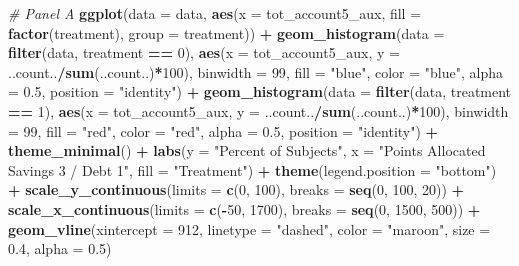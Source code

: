 \documentclass[
]{article}
\newenvironment{Shaded}{\begin{snugshade}}{\end{snugshade}}
\newcommand{\AttributeTok}[1]{\textcolor[rgb]{0.13,0.29,0.53}{#1}}
\newcommand{\CommentTok}[1]{\textcolor[rgb]{0.56,0.35,0.01}{\textit{#1}}}
\newcommand{\DecValTok}[1]{\textcolor[rgb]{0.00,0.00,0.81}{#1}}
\newcommand{\FloatTok}[1]{\textcolor[rgb]{0.00,0.00,0.81}{#1}}
\newcommand{\FunctionTok}[1]{\textcolor[rgb]{0.13,0.29,0.53}{\textbf{#1}}}
\newcommand{\NormalTok}[1]{#1}
\newcommand{\SpecialCharTok}[1]{\textcolor[rgb]{0.81,0.36,0.00}{\textbf{#1}}}
\newcommand{\StringTok}[1]{\textcolor[rgb]{0.31,0.60,0.02}{#1}}
\begin{document}
\begin{Shaded}
\begin{Highlighting}[]
\CommentTok{\# Panel A}
\FunctionTok{ggplot}\NormalTok{(}\AttributeTok{data =}\NormalTok{ data, }\FunctionTok{aes}\NormalTok{(}\AttributeTok{x =}\NormalTok{ tot\_account5\_aux, }\AttributeTok{fill =} \FunctionTok{factor}\NormalTok{(treatment), }\AttributeTok{group =}\NormalTok{ treatment)) }\SpecialCharTok{+}
  \FunctionTok{geom\_histogram}\NormalTok{(}\AttributeTok{data =} \FunctionTok{filter}\NormalTok{(data, treatment }\SpecialCharTok{==} \DecValTok{0}\NormalTok{),}
                 \FunctionTok{aes}\NormalTok{(}\AttributeTok{x =}\NormalTok{ tot\_account5\_aux, }\AttributeTok{y =}\NormalTok{ ..count..}\SpecialCharTok{/}\FunctionTok{sum}\NormalTok{(..count..)}\SpecialCharTok{*}\DecValTok{100}\NormalTok{),}
                 \AttributeTok{binwidth =} \DecValTok{99}\NormalTok{, }\AttributeTok{fill =} \StringTok{"blue"}\NormalTok{, }\AttributeTok{color =} \StringTok{"blue"}\NormalTok{, }\AttributeTok{alpha =} \FloatTok{0.5}\NormalTok{, }\AttributeTok{position =} \StringTok{"identity"}\NormalTok{) }\SpecialCharTok{+}
  \FunctionTok{geom\_histogram}\NormalTok{(}\AttributeTok{data =} \FunctionTok{filter}\NormalTok{(data, treatment }\SpecialCharTok{==} \DecValTok{1}\NormalTok{),}
                 \FunctionTok{aes}\NormalTok{(}\AttributeTok{x =}\NormalTok{ tot\_account5\_aux, }\AttributeTok{y =}\NormalTok{ ..count..}\SpecialCharTok{/}\FunctionTok{sum}\NormalTok{(..count..)}\SpecialCharTok{*}\DecValTok{100}\NormalTok{),}
                 \AttributeTok{binwidth =} \DecValTok{99}\NormalTok{, }\AttributeTok{fill =} \StringTok{"red"}\NormalTok{, }\AttributeTok{color =} \StringTok{"red"}\NormalTok{, }\AttributeTok{alpha =} \FloatTok{0.5}\NormalTok{, }\AttributeTok{position =} \StringTok{"identity"}\NormalTok{) }\SpecialCharTok{+}
  \FunctionTok{theme\_minimal}\NormalTok{() }\SpecialCharTok{+}
  \FunctionTok{labs}\NormalTok{(}\AttributeTok{y =} \StringTok{"Percent of Subjects"}\NormalTok{, }\AttributeTok{x =} \StringTok{"Points Allocated Savings 3 / Debt 1"}\NormalTok{, }\AttributeTok{fill =} \StringTok{"Treatment"}\NormalTok{) }\SpecialCharTok{+}
  \FunctionTok{theme}\NormalTok{(}\AttributeTok{legend.position =} \StringTok{"bottom"}\NormalTok{) }\SpecialCharTok{+}
  \FunctionTok{scale\_y\_continuous}\NormalTok{(}\AttributeTok{limits =} \FunctionTok{c}\NormalTok{(}\DecValTok{0}\NormalTok{, }\DecValTok{100}\NormalTok{), }\AttributeTok{breaks =} \FunctionTok{seq}\NormalTok{(}\DecValTok{0}\NormalTok{, }\DecValTok{100}\NormalTok{, }\DecValTok{20}\NormalTok{)) }\SpecialCharTok{+}
  \FunctionTok{scale\_x\_continuous}\NormalTok{(}\AttributeTok{limits =} \FunctionTok{c}\NormalTok{(}\SpecialCharTok{{-}}\DecValTok{50}\NormalTok{, }\DecValTok{1700}\NormalTok{), }\AttributeTok{breaks =} \FunctionTok{seq}\NormalTok{(}\DecValTok{0}\NormalTok{, }\DecValTok{1500}\NormalTok{, }\DecValTok{500}\NormalTok{)) }\SpecialCharTok{+}
  \FunctionTok{geom\_vline}\NormalTok{(}\AttributeTok{xintercept =} \DecValTok{912}\NormalTok{, }\AttributeTok{linetype =} \StringTok{"dashed"}\NormalTok{, }\AttributeTok{color =} \StringTok{"maroon"}\NormalTok{, }\AttributeTok{size =} \FloatTok{0.4}\NormalTok{, }\AttributeTok{alpha =} \FloatTok{0.5}\NormalTok{)}
\end{Highlighting}
\end{Shaded}
\end{document}
